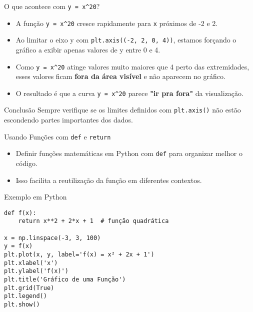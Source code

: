 \begin{frame}{O que acontece com \texttt{y = x\^{}20}?}
    \begin{itemize}
        \item A função \texttt{y = x\^{}20}  cresce rapidamente para \texttt{x} próximos de -2 e 2.
        \item Ao limitar o eixo y com \texttt{plt.axis((-2, 2, 0, 4))}, estamos forçando o gráfico a exibir apenas valores de y entre 0 e 4.
        \item Como \texttt{y = x\^{}20} atinge valores muito maiores que 4 perto das extremidades,
              esses valores ficam \textbf{fora da área visível} e não aparecem no gráfico.
        \item O resultado é que a curva \texttt{y = x\^{}20} parece \textbf{"ir pra fora"} da visualização.
    \end{itemize}


    \begin{alertblock}{Conclusão}
        Sempre verifique se os limites definidos com \texttt{plt.axis()} não estão escondendo partes importantes dos dados.
    \end{alertblock}
\end{frame}


\begin{frame}[fragile]{Usando Funções com \texttt{def} e \texttt{return}}
    \begin{itemize}
        \item Definir funções matemáticas em Python com \texttt{def} para organizar melhor o código.
        \item Isso facilita a reutilização da função em diferentes contextos.
    \end{itemize}

    \begin{block}{Exemplo em Python}
        \begin{verbatim}
def f(x):
    return x**2 + 2*x + 1  # função quadrática

x = np.linspace(-3, 3, 100)
y = f(x)
plt.plot(x, y, label='f(x) = x² + 2x + 1')
plt.xlabel('x')
plt.ylabel('f(x)')
plt.title('Gráfico de uma Função')
plt.grid(True)
plt.legend()
plt.show()
\end{verbatim}
    \end{block}

\end{frame}

